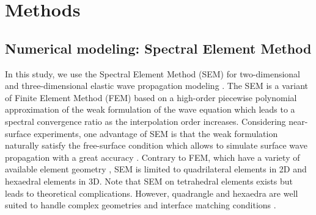 \documentclass[manuscript,revised]{geophysics}
\begin{document}
\section{Methods}

\subsection{Numerical modeling: Spectral Element Method}


\noindent In this study, we use the Spectral Element Method (SEM) for two-dimensional and three-dimensional elastic wave propagation modeling \citep{Komatitsch_SEM_1998,Komatitsch_ISM_1999,Komatitsch_SEM_2005,Festa_PML_2005}. The SEM is a variant of Finite Element Method (FEM) \citep{Lysmer_FEM_1972,Seron_FEM_1990,Hulbert_FEM_1990,Tromp_SEM_2008} based on a high-order piecewise polynomial approximation of the weak formulation of the wave equation which leads to a spectral convergence ratio as the interpolation order increases. Considering near-surface experiments, one advantage of SEM is that the weak formulation naturally satisfy the free-surface condition which allows to simulate surface wave propagation with a great accuracy \citep{komatitsch1998spectral,komatitsch1999spectral,Komatitsch_SEM_2005}. Contrary to FEM, which have a variety of available element geometry \citep{dhatt1984finite}, SEM is limited to quadrilateral elements in 2D and hexaedral elements in 3D. Note that SEM on tetrahedral elements exists \citep{komatitsch2001wave} but leads to theoretical complications. However, quadrangle and hexaedra are well suited to handle complex geometries and interface matching conditions \citep{Cristini_SEM_2012}. 
\end{document}
